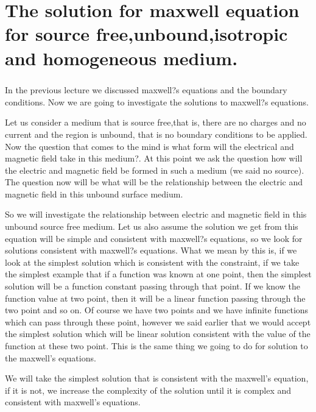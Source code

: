 \chapter{The solution for maxwell equation for source free,unbound,isotropic and homogeneous medium.}

		\paragraph{}
		
		In the previous lecture we discussed maxwell?s equations and the boundary conditions. Now we are going to investigate the solutions to maxwell?s equations.
		
		\bigskip
		
		
		
		Let us consider a medium that is source free,that is, there are no charges and no current and the region is unbound, that is no boundary conditions to be applied. Now the question that comes to the mind is what form will the electrical and magnetic field take in this medium?. At this point we ask the question how will the electric and magnetic field be formed in such a medium (we said no source). The question now will be what will be the relationship between the electric and magnetic field in this unbound surface medium.
		
		So we will investigate the relationship between electric and magnetic field in this unbound source free medium. Let us also assume the solution we get from this equation will be simple and consistent with maxwell?s equations, so we look for solutions consistent with maxwell?s  equations. What we mean by this is, if we look at the simplest solution which is consistent with the constraint, if we take the simplest example that if a function was known at one point, then the simplest solution will be a function constant passing through that point. If we know the function value at two point, then it will be a linear function passing through the two point and so on. Of course we have two points and we have infinite functions which can pass through these point, however we said earlier that we would accept the simplest solution which will be linear solution consistent with the value of the function at these two point. This is the same thing we going to do for solution to the maxwell's equations. 
		
		We will take the simplest solution that is consistent with the maxwell's equation, if it is not, we increase the complexity of the solution until it is complex and consistent with maxwell's equations.
		
